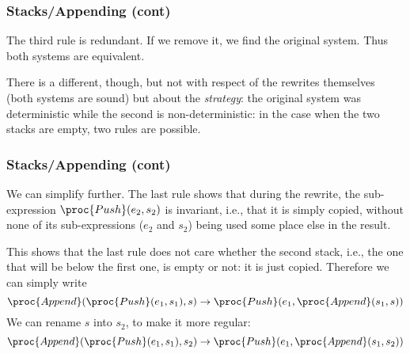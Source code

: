 %
\begin{frame}
\frametitle{Stacks/Appending (cont)}

The third rule is redundant. If we remove it, we find the original
system. Thus both systems are equivalent.

\bigskip

There is a different, though, but not with respect of the rewrites
themselves (both systems are sound) but about the \emph{strategy}: the
original system was deterministic while the second is
non-deterministic: in the case when the two stacks are empty, two
rules are possible.

\end{frame}

%
\begin{frame}
\frametitle{Stacks/Appending (cont)}

We can simplify further. The last rule shows that during the rewrite,
the sub-expression \(\proc{Push} (e_2, s_2)\) is invariant, i.e., that
it is simply copied, without none of its sub-expressions (\(e_2\) and
\(s_2\)) being used some place else in the result.

This shows that the last rule does not care whether the second stack,
i.e., the one that will be below the first one, is empty or not: it is
just copied. Therefore we can simply write
\[
\proc{Append} (\proc{Push} (e_1, s_1), s) \rightarrow \proc{Push}
(e_1, \proc{Append} (s_1, s))
\]
We can rename \(s\) into \(s_2\), to make it more regular:
\[
\proc{Append} (\proc{Push} (e_1, s_1), s_2) \rightarrow \proc{Push}
(e_1, \proc{Append} (s_1, s_2))
\]

\end{frame}

